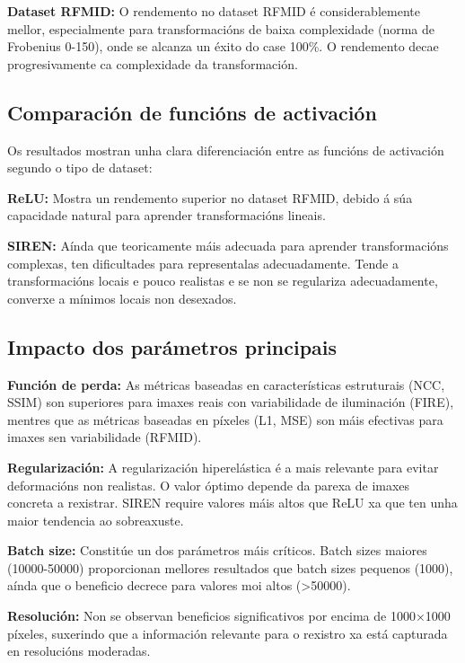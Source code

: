 \textbf{Dataset RFMID:} O rendemento no dataset RFMID é considerablemente mellor, especialmente para transformacións de baixa complexidade (norma de Frobenius 0-150), onde se alcanza un éxito do case 100\%. O rendemento decae progresivamente ca complexidade da transformación. 
\subsection{Comparación de funcións de activación}
\label{subsec:Comparación de funcións de activación}

Os resultados mostran unha clara diferenciación entre as funcións de activación segundo o tipo de dataset:

\textbf{ReLU:} Mostra un rendemento superior no dataset RFMID, debido á súa capacidade natural para aprender transformacións lineais.

\textbf{SIREN:} Aínda que teoricamente máis adecuada para aprender transformacións complexas, ten dificultades para representalas adecuadamente. Tende a transformacións locais e pouco realistas e se non se regulariza adecuadamente, converxe a mínimos locais non desexados.

\subsection{Impacto dos parámetros principais}
\label{subsec:Impacto dos parámetros principais}

\textbf{Función de perda:} As métricas baseadas en características estruturais (NCC, SSIM) son superiores para imaxes reais con variabilidade de iluminación (FIRE), mentres que as métricas baseadas en píxeles (L1, MSE) son máis efectivas para imaxes sen variabilidade (RFMID).

\textbf{Regularización:} A regularización hiperelástica é a mais relevante para evitar deformacións non realistas. O valor óptimo depende da parexa de imaxes concreta a rexistrar. SIREN require valores máis altos que ReLU xa que ten unha maior tendencia ao sobreaxuste.

\textbf{Batch size:} Constitúe un dos parámetros máis críticos. Batch sizes maiores (10000-50000) proporcionan mellores resultados que batch sizes pequenos (1000), aínda que o beneficio decrece para valores moi altos (>50000).

\textbf{Resolución:} Non se observan beneficios significativos por encima de 1000×1000 píxeles, suxerindo que a información relevante para o rexistro xa está capturada en resolucións moderadas.

